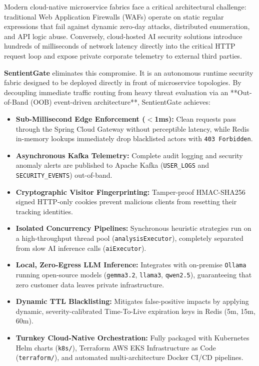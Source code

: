 \documentclass[12pt, a4paper]{article}
\newcommand{\tech}[1]{\texttt{\color{accentblue}#1}}
\begin{document}
Modern cloud-native microservice fabrics face a critical architectural challenge: traditional Web Application Firewalls (WAFs) operate on static regular expressions that fail against dynamic zero-day attacks, distributed enumeration, and API logic abuse. Conversely, cloud-hosted AI security solutions introduce hundreds of milliseconds of network latency directly into the critical HTTP request loop and expose private corporate telemetry to external third parties.

\textbf{SentientGate} eliminates this compromise. It is an autonomous runtime security fabric designed to be deployed directly in front of microservice topologies. By decoupling immediate traffic routing from heavy threat evaluation via an **Out-of-Band (OOB) event-driven architecture**, SentientGate achieves:

\begin{itemize}[leftmargin=*, itemsep=4pt]
    \item \textbf{Sub-Millisecond Edge Enforcement ($<$1ms):} Clean requests pass through the Spring Cloud Gateway without perceptible latency, while Redis in-memory lookups immediately drop blacklisted actors with \texttt{403 Forbidden}.
    \item \textbf{Asynchronous Kafka Telemetry:} Complete audit logging and security anomaly alerts are published to Apache Kafka (\texttt{USER\_LOGS} and \texttt{SECURITY\_EVENTS}) out-of-band.
    \item \textbf{Cryptographic Visitor Fingerprinting:} Tamper-proof HMAC-SHA256 signed HTTP-only cookies prevent malicious clients from resetting their tracking identities.
    \item \textbf{Isolated Concurrency Pipelines:} Synchronous heuristic strategies run on a high-throughput thread pool (\texttt{analysisExecutor}), completely separated from slow AI inference calls (\texttt{aiExecutor}).
    \item \textbf{Local, Zero-Egress LLM Inference:} Integrates with on-premise \tech{Ollama} running open-source models (\texttt{gemma3.2}, \texttt{llama3}, \texttt{qwen2.5}), guaranteeing that zero customer data leaves private infrastructure.
    \item \textbf{Dynamic TTL Blacklisting:} Mitigates false-positive impacts by applying dynamic, severity-calibrated Time-To-Live expiration keys in Redis (5m, 15m, 60m).
    \item \textbf{Turnkey Cloud-Native Orchestration:} Fully packaged with Kubernetes Helm charts (\texttt{k8s/}), Terraform AWS EKS Infrastructure as Code (\texttt{terraform/}), and automated multi-architecture Docker CI/CD pipelines.
\end{itemize}
\end{document}
